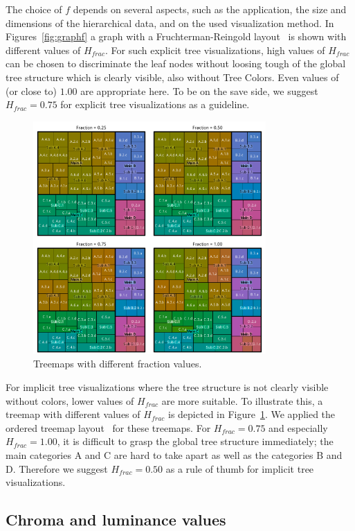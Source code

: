 \documentclass[journal]{vgtc}                %
\begin{document}
The choice of $f$ depends on several aspects, such as the application, the size and dimensions of the hierarchical data, and on the used visualization method. In Figures~\ref{fig:graphf} a graph with a Fruchterman-Reingold layout~\cite{Fruchterman91} is shown with different values of $H_{frac}$. For such explicit tree visualizations, high values of $H_{frac}$ can be chosen to discriminate the leaf nodes without loosing tough of the global tree structure which is clearly visible, also without Tree Colors. Even values of (or close to) $1.00$ are appropriate here. To be on the save side, we suggest $H_{frac}=0.75$ for explicit tree visualizations as a guideline.

\begin{figure}[tb]
  \centering
  \includegraphics[width=3.5in]{Treemaps_hue.pdf}
  \caption{Treemaps with different fraction values.}\label{fig:treemapf}
\end{figure}


For implicit tree visualizations where the tree structure is not clearly visible without colors, lower values of $H_{frac}$ are more suitable. To illustrate this, a treemap with different values of $H_{frac}$ is depicted in Figure~\ref{fig:treemapf}. We applied the ordered treemap layout~\cite{Bederson2002} for these treemaps. For $H_{frac}=0.75$ and especially $H_{frac}=1.00$, it is difficult to grasp the global tree structure immediately; the main categories A and C are hard to take apart as well as the categories B and D. Therefore we suggest $H_{frac}=0.50$ as a rule of thumb for implicit tree visualizations.


\subsection{Chroma and luminance values}
\end{document}

